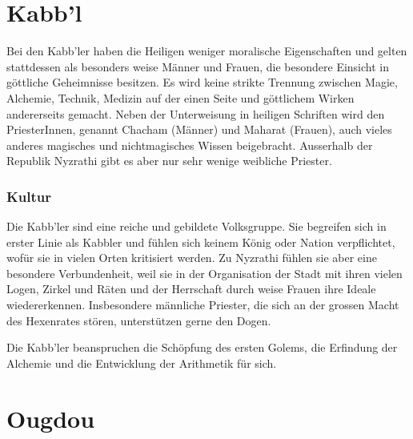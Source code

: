 \documentclass[10pt,twoside,twocolumn,openany]{book}
\begin{document}
\newpage \section{Kabb'l}
\begin{multicols}{2}
Bei den Kabb'ler haben die Heiligen weniger moralische Eigenschaften und gelten stattdessen als besonders weise Männer und Frauen, die besondere Einsicht in göttliche Geheimnisse besitzen. Es wird keine strikte Trennung zwischen Magie, Alchemie, Technik, Medizin auf der einen Seite und göttlichem Wirken andererseits gemacht. Neben der Unterweisung in heiligen Schriften wird den PriesterInnen, genannt Chacham (Männer) und Maharat (Frauen), auch vieles anderes magisches und nichtmagisches Wissen beigebracht. Ausserhalb der Republik Nyzrathi gibt es aber nur sehr wenige weibliche Priester.

\subsubsection{Kultur}
Die Kabb'ler sind eine reiche und gebildete Volksgruppe. Sie begreifen sich in erster Linie als Kabbler und fühlen sich keinem König oder Nation verpflichtet, wofür sie in vielen Orten kritisiert werden. Zu Nyzrathi fühlen sie aber eine besondere Verbundenheit, weil sie in der Organisation der Stadt mit ihren vielen Logen, Zirkel und Räten und der Herrschaft durch weise Frauen ihre Ideale wiedererkennen. Insbesondere  männliche Priester, die sich an der grossen Macht des Hexenrates stören, unterstützen gerne den Dogen.

Die Kabb'ler beanspruchen die Schöpfung des ersten Golems, die Erfindung der Alchemie und die Entwicklung der Arithmetik für sich.
\end{multicols}
\newpage \section{Ougdou}
\end{document}
